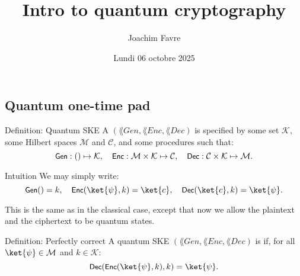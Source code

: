 \documentclass[a4paper]{article}
\title{Intro to quantum cryptography}
\author{Joachim Favre}
\date{Lundi 06 octobre 2025}
\begin{document}
\maketitle


\subsection{Quantum one-time pad}

\begin{parag}{Definition: Quantum SKE}
    A  $\left(\lang{Gen}, \lang{Enc}, \lang{Dec}\right)$ is specified by some set $\mathcal{K}$, some Hilbert spaces $\mathcal{M}$ and $\mathcal{C}$, and some procedures such that: 
    \[\lang{Gen}: \left(\right) \mapsto \mathcal{K}, \mathspace \lang{Enc}: \mathcal{M} \times \mathcal{K}\mapsto \mathcal{C}, \mathspace \lang{Dec}: \mathcal{C} \times \mathcal{K} \mapsto \mathcal{M}.\]
    
    \begin{subparag}{Intuition}
        We may simply write:
        \[\lang{Gen}\left(\right) = k, \mathspace \lang{Enc}\left(\ket{\psi}, k\right) = \ket{c}, \mathspace \lang{Dec}\left(\ket{c}, k\right) = \ket{\psi}.\]

        This is the same as in the classical case, except that now we allow the plaintext and the ciphertext to be quantum states.
    \end{subparag}
\end{parag}

\begin{parag}{Definition: Perfectly correct}
    A quantum SKE $\left(\lang{Gen}, \lang{Enc}, \lang{Dec}\right)$ is  if, for all $\ket{\psi} \in \mathcal{M}$ and $k \in \mathcal{K}$: 
    \[\lang{Dec}\left(\lang{Enc}\left(\ket{\psi}, k\right), k\right) = \ket{\psi}.\]
\end{parag}
\end{document}
